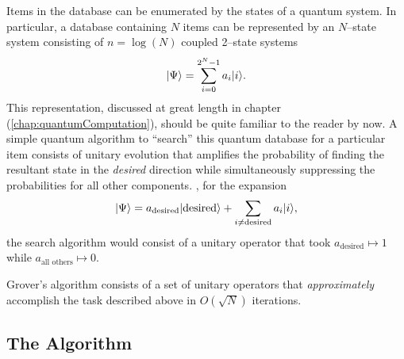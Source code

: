 Items in the database can be enumerated by the states of a quantum system.
In particular, a database containing $N$ items can be represented by an
$N$--state system consisting of $n=\log(N)$ coupled 2--state systems
\begin{equation}
{|{\Psi}\rangle} = \sum_{i=0}^{2^N-1} a_i{|{i}\rangle}.
\end{equation}
This representation, discussed at great
length in chapter (\ref{chap:quantumComputation}),
should be quite familiar to the reader by now.
A simple quantum algorithm to ``search'' this quantum database
for a particular item consists of unitary evolution that amplifies 
the probability of finding the resultant state in the \emph{desired}
direction while simultaneously suppressing the probabilities for all
other components. \ie, for the expansion
\begin{equation}
{|{\Psi}\rangle} = a_{\text{desired}}{|{\text{desired}}\rangle} +
\sum_{i\ne\text{desired}} a_i{|{i}\rangle},
\end{equation}
the search algorithm would consist of a unitary operator that took
$a_{\text{desired}}\mapsto 1$ while $a_{\text{all others}}\mapsto 0$.

Grover's algorithm consists of a set of unitary operators that
{\sl approximately} accomplish the task described above in 
$O(\sqrt{N})$ iterations.   


\subsection{The Algorithm}

